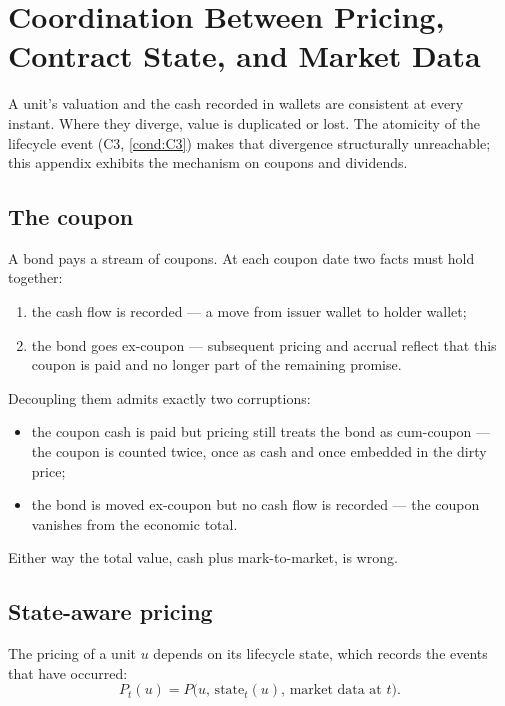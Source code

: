 \documentclass[11pt,a4paper]{article}
\begin{document}

\section{Coordination Between Pricing, Contract State, and Market Data}
\label{app:pricing-coordination}

A unit's valuation and the cash recorded in wallets are consistent at every instant. Where they diverge, value is duplicated or lost. The atomicity of the lifecycle event (C3, \ref{cond:C3}) makes that divergence structurally unreachable; this appendix exhibits the mechanism on coupons and dividends.

\subsection{The coupon}

A bond pays a stream of coupons. At each coupon date two facts must hold together:

\begin{enumerate}
\item the cash flow is recorded --- a move from issuer wallet to holder wallet;
\item the bond goes ex-coupon --- subsequent pricing and accrual reflect that this coupon is paid and no longer part of the remaining promise.
\end{enumerate}

Decoupling them admits exactly two corruptions:

\begin{itemize}
\item the coupon cash is paid but pricing still treats the bond as cum-coupon --- the coupon is counted twice, once as cash and once embedded in the dirty price;
\item the bond is moved ex-coupon but no cash flow is recorded --- the coupon vanishes from the economic total.
\end{itemize}

Either way the total value, cash plus mark-to-market, is wrong.

\subsection{State-aware pricing}

The pricing of a unit $u$ depends on its lifecycle state, which records the events that have occurred:
\[
P_t(u) = P\big(u,\, \mathrm{state}_t(u),\, \text{market data at } t\big).
\]
\end{document}
